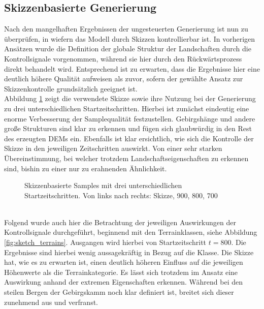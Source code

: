 \subsection {Skizzenbasierte Generierung}

Nach den mangelhaften Ergebnissen der ungesteuerten Generierung ist nun zu überprüfen, in wiefern das Modell durch Skizzen kontrollierbar ist. In vorherigen Ansätzen wurde die Definition der globale Struktur der Landschaften durch die Kontrollsignale vorgenommen, während sie hier durch den Rückwärtsprozess direkt behandelt wird. Entsprechend ist zu erwarten, dass die Ergebnisse hier eine deutlich höhere Qualität aufweisen als zuvor, sofern der gewählte Ansatz zur Skizzenkontrolle grundsätzlich geeignet ist. \\
Abbildung \ref{fig:sketch_strengths} zeigt die verwendete Skizze sowie ihre Nutzung bei der Generierung zu drei unterschiedlichen Startzeitschritten. Hierbei ist zunächst eindeutig eine enorme Verbesserung der Samplequalität festzustellen. Gebirgshänge und andere große Strukturen sind klar zu erkennen und fügen sich glaubwürdig in den Rest des erzeugten \ac{DEM}s ein. Ebenfalls ist klar ersichtlich, wie sich die Kontrolle der Skizze in den jeweiligen Zeitschritten auswirkt. Von einer sehr starken Übereinstimmung, bei welcher trotzdem Landschaftseigenschaften zu erkennen sind, bishin zu einer nur zu erahnenden Ähnlichkeit.  
\begin{figure}[htbp]
    \centering
    \caption{Skizzenbasierte Samples mit drei unterschiedlichen Startzeitschritten. Von links nach rechts: Skizze, 900, 800, 700}
    \label{fig:sketch_strengths}
\end{figure} \\
Folgend wurde auch hier die Betrachtung der jeweiligen Auswirkungen der Kontrollsignale durchgeführt,  beginnend mit den Terrainklassen, siehe Abbildung \ref{fig:sketch_terrains}. Ausgangen wird hierbei von Startzeitschritt $t=800$. Die Ergebnisse sind hierbei wenig aussagekräftig in Bezug auf die Klasse. Die Skizze hat, wie es zu erwarten ist, einen deutlich höheren Einfluss auf die jeweiligen Höhenwerte als die Terrainkategorie. Es lässt sich trotzdem im Ansatz eine Auswirkung anhand der extremen Eigenschaften erkennen. Während bei den steilen Bergen der Gebirgskamm noch klar definiert ist, breitet sich dieser zunehmend aus und verfranst.  
